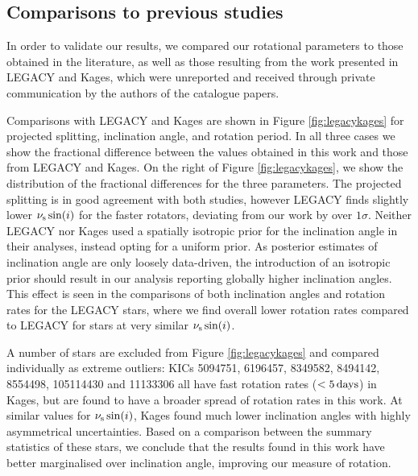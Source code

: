 \documentclass[12pt]{article}
\begin{document}
\subsection{Comparisons to previous studies}\label{ssec:litcomp}
In order to validate our results, we compared our rotational parameters to those obtained in the literature, as well as those resulting from the work presented in LEGACY and Kages, which were unreported and received through private communication by the authors of the catalogue papers.

Comparisons with LEGACY and Kages are shown in Figure \ref{fig:legacykages} for projected splitting, inclination angle, and rotation period. In all three cases we show the fractional difference between the values obtained in this work and those from LEGACY and Kages. On the right of Figure \ref{fig:legacykages}, we show the distribution of the fractional differences for the three parameters.
The projected splitting is in good agreement with both studies, however LEGACY finds slightly lower $\nu_{\rm s}\sin(i)$ for the faster rotators, deviating from our work by over $1\sigma$. Neither LEGACY nor Kages used a spatially isotropic prior for the inclination angle in their analyses, instead opting for a uniform prior. As posterior estimates of inclination angle are only loosely data-driven, the introduction of an isotropic prior should result in our analysis reporting globally higher inclination angles. This effect is seen in the comparisons of both inclination angles and rotation rates for the LEGACY stars, where we find overall lower rotation rates compared to LEGACY for stars at very similar $\nu_{\rm s}\sin(i)$.

A number of stars are excluded from Figure \ref{fig:legacykages} and compared individually as extreme outliers: KICs 5094751, 6196457, 8349582, 8494142, 8554498, 105114430 and 11133306 all have fast rotation rates ($<5\, \rm days$) in Kages, but are found to have a broader spread of rotation rates in this work. At similar values for $\nu_{\rm s}\sin(i)$, Kages found much lower inclination angles with highly asymmetrical uncertainties. Based on a comparison between the summary statistics of these stars, we conclude that the results found in this work have better marginalised over inclination angle, improving our measure of rotation.
\end{document}
